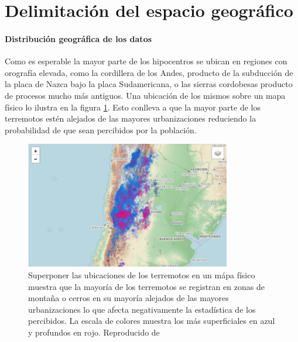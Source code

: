 \documentclass[a4paper]{report}
\begin{document}
\section{Delimitación del espacio geográfico}

\paragraph{Distribución geográfica de los datos}
Como es esperable la mayor parte de los hipocentros se ubican en regiones con orografía elevada, como la cordillera de los Andes, producto de la subducción de la placa de Nazca bajo la placa Sudamericana, o las sierras cordobesas producto de procesos mucho más antiguos. 
Una ubicación de los mismos sobre un mapa físico lo ilustra en la figura \ref{fig:mapa_sismos}.
Esto conlleva a que la mayor parte de los terremotos estén alejados de las mayores urbanizaciones reduciendo la probabilidad de que sean percibidos por la población.
\begin{figure}[!ht]
\centering
\includegraphics[width=0.8\textwidth]{mapa_sismos.png}
\caption{Superponer las ubicaciones de los terremotos en un mápa físico muestra que la mayoría de los terremotos se registran en zonas de montaña o cerros en su mayoría alejados de las mayores urbanizaciones lo que afecta negativamente la estadística de los percibidos.
La escala de colores muestra los más superficiales en azul y profundos en rojo.
Reproducido de \cite{daniela_parada_ic-datasets-docencia_nodate}}
\label{fig:mapa_sismos}
\end{figure}
\end{document}
